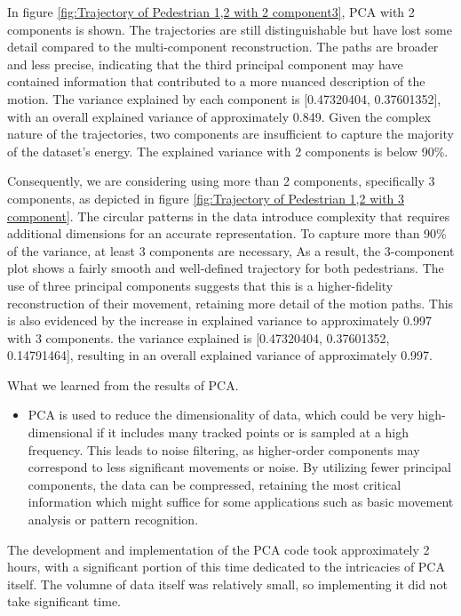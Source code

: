 \begin{itemize}
In figure \ref{fig:Trajectory of Pedestrian 1,2 with 2 component3}, PCA with 2 components is shown. The trajectories are still distinguishable but have lost some detail compared to the multi-component reconstruction. The paths are broader and less precise, indicating that the third principal component may have contained information that contributed to a more nuanced description of the motion. The variance explained by each component is [0.47320404, 0.37601352], with an overall explained variance of approximately 0.849. Given the complex nature of the trajectories, two components are insufficient to capture the majority of the dataset's energy. The explained variance with 2 components is below 90\%.

Consequently, we are considering using more than 2 components, specifically 3 components, as depicted in figure \ref{fig:Trajectory of Pedestrian 1,2 with 3 component}. The circular patterns in the data introduce complexity that requires additional dimensions for an accurate representation. To capture more than 90\% of the variance, at least 3 components are necessary, As a result, the 3-component plot shows a fairly smooth and well-defined trajectory for both pedestrians. The use of three principal components suggests that this is a higher-fidelity reconstruction of their movement, retaining more detail of the motion paths. This is also evidenced by the increase in explained variance to approximately 0.997 with 3 components. the variance explained is [0.47320404, 0.37601352, 0.14791464], resulting in an overall explained variance of approximately 0.997.

What we learned from the results of PCA.

\begin{itemize}
    \item PCA is used to reduce the dimensionality of data, which could be very high-dimensional if it includes many tracked points or is sampled at a high frequency. This leads to noise filtering, as higher-order components may correspond to less significant movements or noise. By utilizing fewer principal components, the data can be compressed, retaining the most critical information which might suffice for some applications such as basic movement analysis or pattern recognition.
    \end{itemize}

\end{itemize}


The development and implementation of the PCA code took approximately 2 hours, with a significant portion of this time dedicated to the intricacies of PCA itself. The volumne of data itself was relatively small, so implementing it did not take significant time. 

